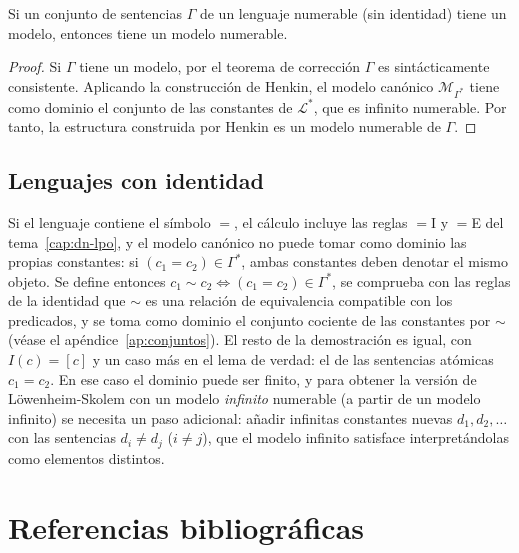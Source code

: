 \begin{corollary}
Si un conjunto de sentencias $\Gamma$ de un lenguaje numerable (sin identidad) tiene un modelo, entonces tiene un modelo numerable.
\end{corollary}

\begin{proof}
Si $\Gamma$ tiene un modelo, por el teorema de corrección $\Gamma$ es sintácticamente consistente. Aplicando la construcción de Henkin, el modelo canónico $\mathcal{M}_{\Gamma^*}$ tiene como dominio el conjunto de las constantes de $\mathcal{L}^*$, que es infinito numerable. Por tanto, la estructura construida por Henkin es un modelo numerable de $\Gamma$.
\end{proof}

\subsection{Lenguajes con identidad}\label{sec_henkin_identidad}
Si el lenguaje contiene el símbolo $=$, el cálculo incluye las reglas
$=$I y $=$E del tema~\ref{cap:dn-lpo}, y el modelo canónico no puede
tomar como dominio las propias constantes: si $(c_1 = c_2) \in
\Gamma^*$, ambas constantes deben denotar el mismo objeto. Se define
entonces $c_1 \sim c_2 \iff (c_1 = c_2) \in \Gamma^*$, se comprueba
con las reglas de la identidad que $\sim$ es una relación de
equivalencia compatible con los predicados, y se toma como dominio el
conjunto cociente de las constantes por $\sim$ (véase el
apéndice~\ref{ap:conjuntos}). El resto de la demostración es igual, con $I(c) = [c]$ y un caso más en el lema de verdad: el de las sentencias atómicas $c_1 = c_2$. En
ese caso el dominio puede ser finito, y para obtener la versión de
Löwenheim-Skolem con un modelo \emph{infinito} numerable (a partir de
un modelo infinito) se necesita un paso adicional: añadir infinitas constantes nuevas $d_1, d_2, \dots$ con las sentencias $d_i \neq d_j$ ($i \neq j$), que el modelo infinito satisface interpretándolas como elementos distintos.

\section*{Referencias bibliográficas}

